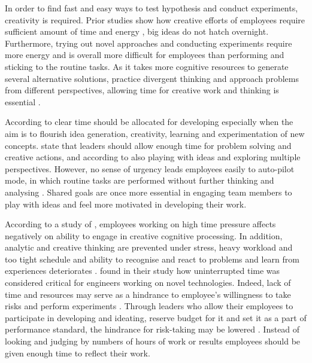 In order to find fast and easy ways to test hypothesis and conduct experiments, creativity is required. Prior studies show how creative efforts of employees require sufficient amount of time and energy \citep{gardner1988creativity,getzels1975problem}, big ideas do not hatch overnight. Furthermore, trying out novel approaches and conducting experiments require more energy and is overall more difficult for employees than performing and sticking to the routine tasks. As it takes more cognitive resources to generate several alternative solutions, practice divergent thinking and approach problems from different perspectives, allowing time for creative work and thinking is essential \citep{amabile2002creativity,shalley2004leaders}. 

According to \citet{amabile2002creativity} clear time should be allocated for developing especially when the aim is to flourish idea generation, creativity, learning and experimentation of new concepts. \citet{redmond1993putting} state that leaders should allow enough time for problem solving and creative actions, and according to \citet{amabile1987creativity} also playing with ideas and exploring multiple perspectives. However, no sense of urgency leads employees easily to auto-pilot mode, in which routine tasks are performed without further thinking and analysing \citep{amabile2002creativity}. Shared goals are once more essential in engaging team members to play with ideas and feel more motivated in developing their work. \citep{amabile2002creativity} 

According to a study of \citet{amabile2002creativity}, employees working on high time pressure affects negatively on ability to engage in creative cognitive processing. In addition, analytic and creative thinking are prevented under stress, heavy workload and too tight schedule and ability to recognise and react to problems and learn from experiences deteriorates \citep{garvin2008yours}.  \citet{katz1985project} found in their study how uninterrupted time was considered critical for engineers working on novel technologies. Indeed, lack of time and resources may serve as a hindrance to employee's willingness to take risks and perform experiments \citep{jung2003role}. Through leaders who allow their employees to participate in developing and ideating, reserve budget for it and set it as a part of performance standard, the hindrance for risk-taking may be lowered \citep{jung2003role}. Instead of looking and judging by numbers of hours of work or results employees should be given enough time to reflect their work. 
 
